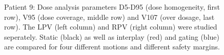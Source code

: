 \documentclass[type=dr, dr=rernat, accentcolor=tud7b,colorbacktitle, bigchapter, openright, twoside, 12pt ]{tudthesis}
\begin{document}
\begin{figure}[H]
{ }
\caption{Patient 9: Dose analysis parameters D5-D95 (dose homogeneity, first row), V95 (dose coverage, middle row) and V107 (over dosage, last row). 
The LPV (left column) and RPV (right column) were studied seperately. Static (black) as well as interplay (red) and gating (blue) 
are compared for four different motions and different safety margins.}
\label{static_interplay_gating_Pat09}
\end{figure}


\newpage
\end{document}
